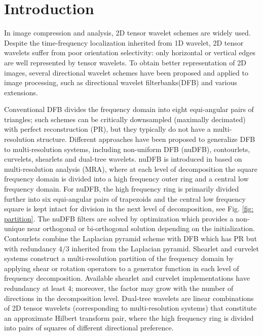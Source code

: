 \section{Introduction}

\iffalse
\begin{itemize}
\item review construction of directional wavelet, shearlet
\item what's new in our construction?
\item summary: framework, technique, reference(Durand, Cohen)
\item organization of the paper
\end{itemize}
\fi

In image compression and analysis, 2D tensor wavelet schemes are widely used. Despite the time-frequency localization inherited from 1D wavelet, 2D tensor wavelets suffer from poor orientation selectivity: only horizontal or vertical edges are well represented by tensor wavelets. To obtain better representation of 2D images, several directional wavelet schemes have been proposed and applied to image processing, such as directional wavelet filterbanks(DFB) and various extensions.

Conventional DFB \cite{DFB92} divides the frequency domain into eight equi-angular pairs of triangles; such schemes can be critically downsampled (maximally decimated) with perfect reconstruction (PR), but they typically do not have a multi-resolution structure. 
Different approaches have been proposed to generalize DFB to multi-resolution systems, including non-uniform DFB (nuDFB), contourlets, curvelets, shearlets and dual-tree wavelets.
nuDFB is introduced in \cite{nuDFB05} based on multi-resolution analysis (MRA), where at each level of decomposition the square frequency domain is divided into a high frequency outer ring and a central low frequency domain. For nuDFB, the high frequency ring is primarily divided further into six equi-angular pairs of trapezoids and the central low frequency square is kept intact for division in the next level of decomposition, see Fig. \ref{fig: partition}. The nuDFB filters are solved by optimization which provides a non-unique near orthogonal or bi-orthogonal solution depending on the initialization.
Contourlets \cite{do2005contourlet} combine the Laplacian pyramid scheme with DFB which has PR but with redundancy $4/3$ inherited from the Laplacian pyramid.
Shearlet \cite{shearlet12book,easley2008sparse} and curvelet \cite{candes2006fast} systems construct a multi-resolution partition of the frequency domain by applying shear or rotation operators to a generator function in each level of frequency decomposition. Available shearlet and curvelet implementations have redundancy at least 4; moreover, the factor may grow with the number of directions in the decomposition level.
Dual-tree wavelets \cite{selesnick2005dual} are linear combinations of 2D tensor wavelets (corresponding to multi-resolution systems) that constitute an approximate Hilbert transform pair, where the high frequency ring is divided into pairs of squares of different directional preference.

